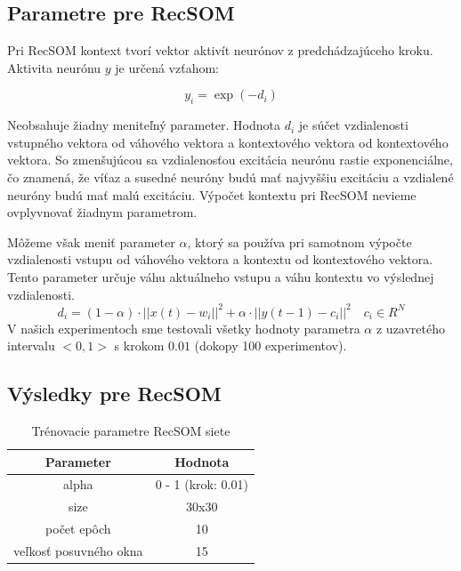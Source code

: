 \subsection{Parametre pre RecSOM}
Pri RecSOM kontext tvorí vektor aktivít neurónov z predchádzajúceho kroku.
Aktivita neurónu $y$ je určená vzťahom:

\begin{equation}
    y_{i} = \exp{(-d_{i})}
\end{equation}

Neobsahuje žiadny meniteľný parameter. Hodnota $d_{i}$ je súčet vzdialenosti vstupného vektora od váhového vektora a kontextového vektora od 
kontextového vektora. So zmenšujúcou sa vzdialenosťou excitácia neurónu rastie exponenciálne, čo 
znamená, že víťaz a susedné neuróny budú mať najvyššiu excitáciu a vzdialené neuróny budú mať malú excitáciu.
Výpočet kontextu pri RecSOM nevieme ovplyvnovať žiadnym parametrom.

Môžeme však meniť parameter $\alpha$, ktorý sa používa pri samotnom výpočte vzdialenosti
vstupu od váhového vektora a kontextu od kontextového vektora. Tento parameter určuje váhu aktuálneho vstupu a váhu kontextu
vo výslednej vzdialenosti.
\begin{equation}
	d_i = (1 - \alpha) \cdot ||x(t) - w_i||^{2} + \alpha \cdot ||y(t-1) - c_i||^{2} \quad c_{i} \in R^{N}
\end{equation}
V našich experimentoch sme testovali všetky hodnoty parametra $\alpha$ z uzavretého intervalu
$<0, 1>$ s krokom $0.01$ (dokopy 100 experimentov).

\subsection{Výsledky pre RecSOM}

\begin{table}[h!]
    \centering
    \begin{tabular}{|c|c|} 
     \hline
     Parameter & Hodnota \\ 
     \hline\hline
     alpha & 0 - 1  (krok: 0.01) \\ 
     \hline
     size & 30x30  \\
     \hline
     počet epôch & 10  \\
     \hline
     veľkosť posuvného okna & 15  \\
     \hline
    \end{tabular}
    \caption{Trénovacie parametre RecSOM siete}
    \label{table:1}
    \end{table}

